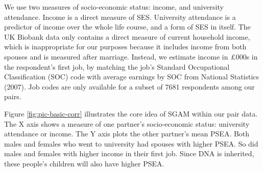 \documentclass[
]{article}
\theoremstyle{definition}
\theoremstyle{definition}
\theoremstyle{definition}
\theoremstyle{definition}
\theoremstyle{remark}
\begin{document}
We use two measures of socio-economic status: income, and university attendance.
Income is a direct measure of SES. University attendance is a predictor of
income over the whole life course, and a form of SES in itself. The UK Biobank
data only contains a direct measure of current household income, which is
inappropriate for our purposes because it includes income from both spouses and
is measured after marriage. Instead, we estimate income in £000s in the
respondent's first job, by matching the job's Standard Occupational
Classification (SOC) code with average earnings by SOC from National Statistics (2007). Job
codes are only available for a subset of 7681 respondents among
our pairs.

Figure \ref{fig:pic-basic-corr} illustrates the core idea of SGAM within our
pair data. The X axis shows a measure of one partner's socio-economic status:
university attendance or income. The Y axis plots the other partner's mean PSEA.
Both males and females who went to university had spouses with higher PSEA. So
did males and females with higher income in their first job. Since DNA is
inherited, these people's children will also have higher PSEA.
\end{document}
